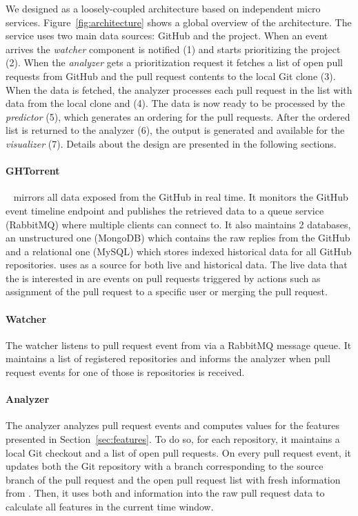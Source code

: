 \documentclass[conference]{IEEEtran}
\begin{document}
We designed \prioritizer as a loosely-coupled architecture based on independent
micro services. Figure~\ref{fig:architecture} shows a global overview of the
architecture.  The \prioritizer service uses two main data sources: GitHub and
the \ghtorrent project.  When an event arrives the \emph{watcher} component is
notified (1) and starts prioritizing the project (2).  When the \emph{analyzer}
gets a prioritization request it fetches a list of open pull requests from
GitHub and the pull request contents to the local Git clone (3).  When the data
is fetched, the analyzer processes each pull request in the list with data from the local
clone and \ghtorrent (4).  The data is now ready to be processed by the
\emph{predictor} (5), which generates an ordering for the pull requests.  After
the ordered list is returned to the analyzer (6), the output is generated and
available for the \emph{visualizer} (7).  Details about the design are presented 
in the following sections.

\paragraph{GHTorrent}
\ghtorrent~\cite{G13} mirrors all data exposed from the GitHub \api in
real time. It monitors the GitHub event timeline \api endpoint and publishes the 
retrieved data to a queue service (RabbitMQ) where multiple clients can connect to. 
It also maintains 2 databases, an unstructured one (MongoDB)
which contains the raw replies from the GitHub \api and a relational one
(MySQL) which stores indexed historical data for all GitHub repositories.
\prioritizer uses \ghtorrent as a source for both live and historical data. The live data
that the \prioritizer is interested in are events on pull requests triggered by actions 
such as assignment of the pull request to a specific user or merging the pull request.

\paragraph{Watcher}
The watcher listens to pull request event from \ghtorrent
via a RabbitMQ message queue. It maintains a list of registered repositories
and informs the analyzer when pull request events for one of those is
repositories is received.

\paragraph{Analyzer}
The analyzer analyzes pull request events and computes values for
the features presented in Section~\ref{sec:features}. To do so, for each repository,
it maintains a local Git checkout and a list of open pull requests.
On every pull request event, it updates both the Git repository with
a branch corresponding to the source branch of the pull request
and the open pull request list with fresh information from \ghtorrent.
Then, it uses both \ghtorrent and information into the raw pull request
data to calculate all features in the current time window.
\end{document}
